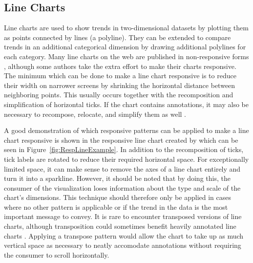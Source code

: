 \subsection{Line Charts}
\label{sec:LineChartExamples}

Line charts are used to show trends in two-dimensional
datasets by plotting them as points connected by lines (a polyline).
They can be extended to compare trends in an additional categorical
dimension by drawing additional polylines for each category. Many line
charts on the web are published in non-responsive forms
\parencite{HLine,HLine2}, although some authors take the extra effort
to make their charts responsive. The minimum which can be done to make
a line chart responsive is to reduce their width
\parencite{RespRadialScatterHLine} on narrower screens by shrinking
the horizontal distance between neighboring points. This usually
occurs together with the recomposition and simplification of
horizontal ticks. If the chart contains annotations, it may also be
necessary to recompose, relocate, and simplify them as well
\parencite{RespHLines,RespHLine,RespHBarHLine,RespHLineHStackedBar}.

A good demonstration of which responsive patterns can be applied to
make a line chart responsive is shown in the responsive line chart
created by \textcite{RespVis} which can be seen in
Figure~\ref{fig:RespLineExample}. In addition to the recomposition of
ticks, tick labels are rotated to reduce their required horizontal
space. For exceptionally limited space, it can make sense to remove
the axes of a line chart entirely and turn it into a sparkline.
However, it should be noted that by doing this, the consumer of the
visualization loses information about the type and scale of the
chart's dimensions. This technique should therefore only be applied in
cases where no other pattern is applicable or if the trend in the data
is the most important message to convey. It is rare to encounter
transposed versions of line charts, although transposition could
sometimes benefit heavily annotated line charts \parencite{VLine}.
Applying a transpose pattern would allow the chart to take up as much
vertical space as necessary to neatly accomodate annotations without
requiring the consumer to scroll horizontally.



